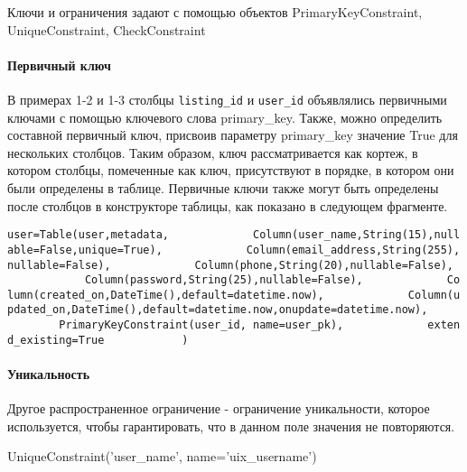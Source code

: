 \documentclass[11pt]{article}
\begin{document}
Ключи и ограничения задают с помощью объектов PrimaryKeyConstraint,
UniqueConstraint, CheckConstraint

    \paragraph{Первичный
ключ}\label{ux43fux435ux440ux432ux438ux447ux43dux44bux439-ux43aux43bux44eux447}

В примерах 1-2 и 1-3 столбцы \texttt{listing\_id} и \texttt{user\_id}
объявлялись первичными ключами с помощью ключевого слова primary\_key.
Также, можно определить составной первичный ключ, присвоив параметру
primary\_key значение True для нескольких столбцов. Таким образом, ключ
рассматривается как кортеж, в котором столбцы, помеченные как ключ,
присутствуют в порядке, в котором они были определены в таблице.
Первичные ключи также могут быть определены после столбцов в
конструкторе таблицы, как показано в следующем фрагменте.

\texttt{user=Table(\textquotesingle{}user\textquotesingle{},metadata,\ \ \ \ \ \ \ \ \ \ \ \ \ Column(\textquotesingle{}user\_name\textquotesingle{},String(15),nullable=False,unique=True),\ \ \ \ \ \ \ \ \ \ \ \ \ Column(\textquotesingle{}email\_address\textquotesingle{},String(255),nullable=False),\ \ \ \ \ \ \ \ \ \ \ \ \ Column(\textquotesingle{}phone\textquotesingle{},String(20),nullable=False),\ \ \ \ \ \ \ \ \ \ \ \ \ Column(\textquotesingle{}password\textquotesingle{},String(25),nullable=False),\ \ \ \ \ \ \ \ \ \ \ \ \ Column(\textquotesingle{}created\_on\textquotesingle{},DateTime(),default=datetime.now),\ \ \ \ \ \ \ \ \ \ \ \ \ Column(\textquotesingle{}updated\_on\textquotesingle{},DateTime(),default=datetime.now,onupdate=datetime.now),\ \ \ \ \ \ \ \ \ \ \ \ \ PrimaryKeyConstraint(\textquotesingle{}user\_id\textquotesingle{},\ name=\textquotesingle{}user\_pk\textquotesingle{}),\ \ \ \ \ \ \ \ \ \ \ \ \ extend\_existing=True\ \ \ \ \ \ \ \ \ \ \ \ )}

    \paragraph{Уникальность}\label{ux443ux43dux438ux43aux430ux43bux44cux43dux43eux441ux442ux44c}

Другое распространенное ограничение - ограничение уникальности, которое
используется, чтобы гарантировать, что в данном поле значения не
повторяются.

UniqueConstraint('user\_name', name='uix\_username')
\end{document}
